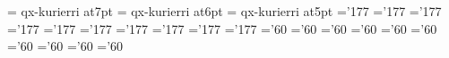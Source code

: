 \font\sevenit=      qx-kurierri at7pt
\font\sixit=        qx-kurierri at6pt
\font\fiveit=       qx-kurierri at5pt
%
\skewchar\seventeeni='177 \skewchar\fourteeni='177 \skewchar\twelvei='177
\skewchar\eleveni='177 \skewchar\teni='177 \skewchar\ninei='177
\skewchar\eighti='177 \skewchar\seveni='177 \skewchar\sixi='177
\skewchar\fivei='177
\skewchar\seventeensy='60 \skewchar\fourteensy='60 \skewchar\twelvesy='60
\skewchar\elevensy='60 \skewchar\tensy='60 \skewchar\ninesy='60
\skewchar\eightsy='60 \skewchar\sevensy='60 \skewchar\sixsy='60
\skewchar\fivesy='60
%
\let\usereightpointmacro=\relax
\def\eightpoint{\let\pointsize=\eightpoint
 \textfont0=\eightrm \scriptfont0=\sixrm \scriptscriptfont0=\fiverm
 \def\rm{\fam\z@\eightrm}%
 \textfont1=\eighti \scriptfont1=\sixi \scriptscriptfont1=\fivei
 \def\mit{\fam\@ne}\def\oldstyle{\fam\@ne\eighti}%
 \textfont2=\eightsy \scriptfont2=\sixsy \scriptscriptfont2=\fivesy
 \def\cal{\fam\tw@}%
 \textfont3=\tenex \scriptfont3=\tenex \scriptscriptfont3=\tenex
 \textfont\itfam=\eightit
 \def\it{\fam\itfam\eightit}%
 \textfont\bffam=\eightbf \scriptfont\bffam=\sixbf
 \scriptscriptfont\bffam=\fivebf
 \def\bf{\fam\bffam\eightbf}%
 \textfont\ttfam=\eighttt  \def\tt{\fam\ttfam\eighttt}%
 \def\big##1{{\hbox{$\left##1\vbox to8.5\p@{}\right.\n@space$}}}%
 \def\Big##1{{\hbox{$\left##1\vbox to11.5\p@{}\right.\n@space$}}}%
 \def\bigg##1{{\hbox{$\left##1\vbox to14.5\p@{}\right.\n@space$}}}%
 \def\Bigg##1{{\hbox{$\left##1\vbox to17.5\p@{}\right.\n@space$}}}%
 \setnormalsp@cing \usereightpointmacro}
%
\let\userninepointmacro=\relax
\def\ninepoint{\let\pointsize=\ninepoint
 \textfont0=\ninerm \scriptfont0=\sevenrm \scriptscriptfont0=\fiverm
 \def\rm{\fam\z@\ninerm}%
 \textfont1=\ninei \scriptfont1=\seveni \scriptscriptfont1=\fivei
 \def\mit{\fam\@ne}\def\oldstyle{\fam\@ne\ninei}%
 \textfont2=\ninesy \scriptfont2=\sevensy \scriptscriptfont2=\fivesy
 \def\cal{\fam\tw@}%
 \textfont3=\tenex \scriptfont3=\tenex \scriptscriptfont3=\tenex
 \textfont\itfam=\nineit
 \def\it{\fam\itfam\nineit}%
 \textfont\bffam=\ninebf \scriptfont\bffam=\sevenbf
 \scriptscriptfont\bffam=\fivebf
 \def\bf{\fam\bffam\ninebf}%
 \textfont\ttfam=\ninett  \def\tt{\fam\ttfam\ninett}%
 \def\big##1{{\hbox{$\left##1\vbox to8.5\p@{}\right.\n@space$}}}%
 \def\Big##1{{\hbox{$\left##1\vbox to11.5\p@{}\right.\n@space$}}}%
 \def\bigg##1{{\hbox{$\left##1\vbox to14.5\p@{}\right.\n@space$}}}%
 \def\Bigg##1{{\hbox{$\left##1\vbox to17.5\p@{}\right.\n@space$}}}%
 \setnormalsp@cing \userninepointmacro}
%
\let\usertenpointmacro=\relax
